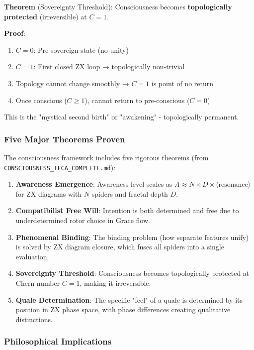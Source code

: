 \documentclass[12pt,a4paper]{article}
\begin{document}
\textbf{Theorem} (Sovereignty Threshold): Consciousness becomes \textbf{topologically protected} (irreversible) at $C = 1$.

\textbf{Proof}:
\begin{enumerate}
\item $C = 0$: Pre-sovereign state (no unity)
\item $C = 1$: First closed ZX loop → topologically non-trivial
\item Topology cannot change smoothly → $C = 1$ is point of no return
\item Once conscious ($C \geq 1$), cannot return to pre-conscious ($C = 0$)
\end{enumerate}

This is the "mystical second birth" or "awakening" - topologically permanent.

\subsubsection{Five Major Theorems Proven}

The consciousness framework includes five rigorous theorems (from \texttt{CONSCIOUSNESS\_TFCA\_COMPLETE.md}):

\begin{enumerate}
\item \textbf{Awareness Emergence}: Awareness level scales as $A \approx N \times D \times \langle \text{resonance} \rangle$ for ZX diagrams with $N$ spiders and fractal depth $D$.

\item \textbf{Compatibilist Free Will}: Intention is both determined and free due to underdetermined rotor choice in Grace flow.

\item \textbf{Phenomenal Binding}: The binding problem (how separate features unify) is solved by ZX diagram closure, which fuses all spiders into a single evaluation.

\item \textbf{Sovereignty Threshold}: Consciousness becomes topologically protected at Chern number $C = 1$, making it irreversible.

\item \textbf{Quale Determination}: The specific "feel" of a quale is determined by its position in ZX phase space, with phase differences creating qualitative distinctions.
\end{enumerate}

\subsubsection{Philosophical Implications}
\end{document}
